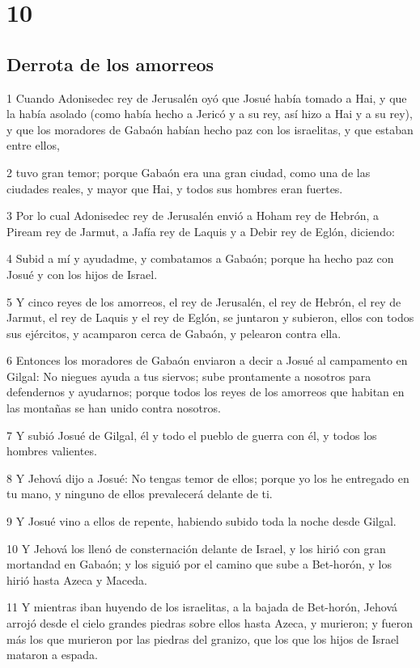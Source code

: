 \chapter{10}

\section*{Derrota de los amorreos}

\par 1 Cuando Adonisedec rey de Jerusalén oyó que Josué había tomado a Hai, y que la había asolado (como había hecho a Jericó y a su rey, así hizo a Hai y a su rey), y que los moradores de Gabaón habían hecho paz con los israelitas, y que estaban entre ellos,
\par 2 tuvo gran temor; porque Gabaón era una gran ciudad, como una de las ciudades reales, y mayor que Hai, y todos sus hombres eran fuertes.
\par 3 Por lo cual Adonisedec rey de Jerusalén envió a Hoham rey de Hebrón, a Piream rey de Jarmut, a Jafía rey de Laquis y a Debir rey de Eglón, diciendo:
\par 4 Subid a mí y ayudadme, y combatamos a Gabaón; porque ha hecho paz con Josué y con los hijos de Israel.
\par 5 Y cinco reyes de los amorreos, el rey de Jerusalén, el rey de Hebrón, el rey de Jarmut, el rey de Laquis y el rey de Eglón, se juntaron y subieron, ellos con todos sus ejércitos, y acamparon cerca de Gabaón, y pelearon contra ella.
\par 6 Entonces los moradores de Gabaón enviaron a decir a Josué al campamento en Gilgal: No niegues ayuda a tus siervos; sube prontamente a nosotros para defendernos y ayudarnos; porque todos los reyes de los amorreos que habitan en las montañas se han unido contra nosotros.
\par 7 Y subió Josué de Gilgal, él y todo el pueblo de guerra con él, y todos los hombres valientes.
\par 8 Y Jehová dijo a Josué: No tengas temor de ellos; porque yo los he entregado en tu mano, y ninguno de ellos prevalecerá delante de ti.
\par 9 Y Josué vino a ellos de repente, habiendo subido toda la noche desde Gilgal.
\par 10 Y Jehová los llenó de consternación delante de Israel, y los hirió con gran mortandad en Gabaón; y los siguió por el camino que sube a Bet-horón, y los hirió hasta Azeca y Maceda.
\par 11 Y mientras iban huyendo de los israelitas, a la bajada de Bet-horón, Jehová arrojó desde el cielo grandes piedras sobre ellos hasta Azeca, y murieron; y fueron más los que murieron por las piedras del granizo, que los que los hijos de Israel mataron a espada.
